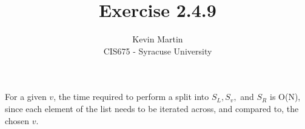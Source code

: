 \documentclass{article}
\author{Kevin Martin\\ CIS675 - Syracuse University}
\title{Exercise 2.4.9}
\begin{document}
\maketitle
For a given $v$, the time required to perform a split into \(S_L, S_v,\) and \(S_R\) is O(N), since each 
element of the list needs to be iterated across, and compared to, the chosen $v$.
\end{document}
